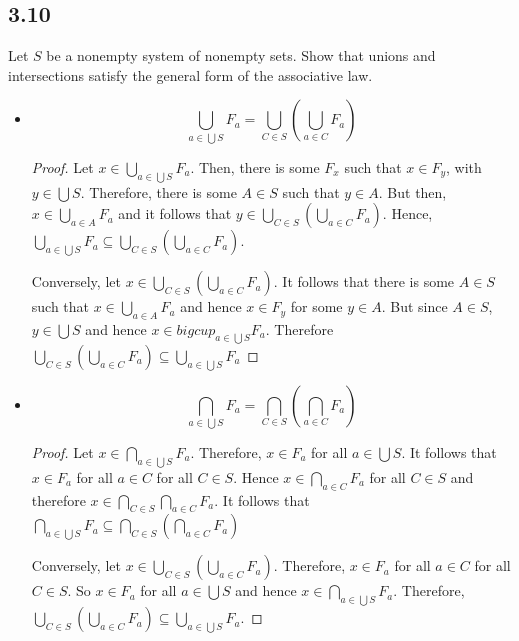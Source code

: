 \subsection*{3.10} Let $S$ be a nonempty system of nonempty sets. Show that unions and intersections satisfy the general form of the associative law.

\begin{itemize}
    \item $$\bigcup_{a \in \bigcup S} F_a = \bigcup_{C \in S} (\bigcup_{a\in C} F_a)$$
    
    \begin{proof}
        Let $x \in \bigcup_{a \in \bigcup S} F_a$. Then, there is some $F_x$ such that $x \in F_y$, with $y \in \bigcup S$. Therefore, there is some $A \in S$ such that $y \in A$. But then, $x \in \bigcup_{a \in A} F_a$ and it follows that $y \in \bigcup_{C \in S} (\bigcup_{a\in C} F_a)$. Hence, $\bigcup_{a \in \bigcup S} F_a \subseteq \bigcup_{C \in S} (\bigcup_{a\in C} F_a)$.
        
        Conversely, let $x \in \bigcup_{C \in S} (\bigcup_{a\in C} F_a)$. It follows that there is some $A \in S$ such that $x \in \bigcup_{a\in A} F_a$ and hence $x \in F_y$ for some $y \in A$. But since $A \in S$, $y \in \bigcup S$ and hence $x \in bigcup_{a \in \bigcup S} F_a$. Therefore $\bigcup_{C \in S} (\bigcup_{a\in C} F_a) \subseteq \bigcup_{a \in \bigcup S} F_a $
    \end{proof}
    
    \item $$\bigcap_{a \in \bigcup S} F_a = \bigcap_{C \in S} (\bigcap_{a \in C} F_a)$$
    
    \begin{proof}
        Let $x \in \bigcap_{a \in \bigcup S} F_a$. Therefore, $x \in F_a$ for all $a \in \bigcup S$. It follows that $x \in F_a$ for all $a \in C$ for all $C \in S$. Hence $x \in \bigcap_{a \in C} F_a$ for all $C \in S$ and therefore $x \in \bigcap_{C \in S} \bigcap_{a \in C} F_a$. It follows that $\bigcap_{a \in \bigcup S} F_a \subseteq \bigcap_{C \in S} (\bigcap_{a \in C} F_a)$
        
        Conversely, let $x \in \bigcup_{C \in S} (\bigcup_{a\in C} F_a)$. Therefore, $x \in F_a$ for all $a \in C$ for all $C \in S$. So $x \in F_a$ for all $a \in \bigcup S$ and hence $x \in \bigcap_{a \in \bigcup S} F_a$. Therefore, $\bigcup_{C \in S} (\bigcup_{a\in C} F_a) \subseteq \bigcup_{a \in \bigcup S} F_a$.
    \end{proof}
\end{itemize}

\newpage

